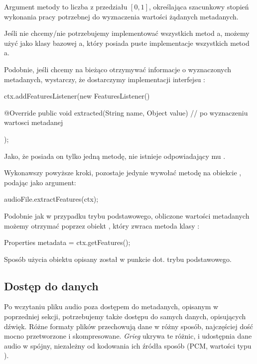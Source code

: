 Argument  metody  to liczba z przedziału $[0, 1]$, określająca szacunkowy
stopień wykonania pracy potrzebnej do wyznaczenia wartości żądanych metadanych.

Jeśli nie chcemy/nie potrzebujemy implementować wszystkich metod a, możemy
użyć jako klasy bazowej a, który posiada puste implementacje wszystkich metod
a.

Podobnie, jeśli chcemy na bieżąco otrzymywać informacje o wyznaczonych metadanych, wystarczy, że
dostarczymy implementacji interfejsu :

\begin{java}
ctx.addFeaturesListener(new FeaturesListener() {

    @Override
    public void extracted(String name, Object value) {
        // po wyznaczeniu wartosci metadanej
    }
});
\end{java}

Jako, że posiada on tylko jedną metodę, nie istnieje odpowiadający mu .

Wykonawszy powyższe kroki, pozostaje jedynie wywołać metodę  na obiekcie
, podając  jako argument:

\begin{java}
audioFile.extractFeatures(ctx);
\end{java}

Podobnie jak w przypadku trybu podstawowego, obliczone wartości metadanych możemy otrzymać poprzez
obiekt , który zwraca metoda  klasy :

\begin{java}
Properties metadata = ctx.getFeatures();
\end{java}

Sposób użycia obiektu  opisany został w punkcie dot. trybu podstawowego.

\subsection{Dostęp do danych}

Po wczytaniu pliku audio poza dostępem do metadanych, opisanym w poprzedniej sekcji, potrzebujemy
także dostępu do samych danych, opisujących dźwięk. Różne formaty plików przechowują dane w różny
sposób, najczęściej dość mocno przetworzone i skompresowane. \emph{Grieg} ukrywa te różnic, i
udostępnia dane audio w spójny, niezależny od kodowania ich źródła sposób (PCM, wartości typu
).

